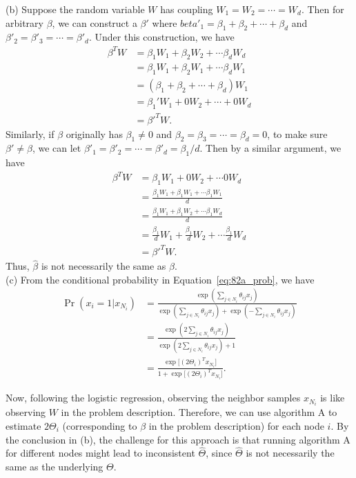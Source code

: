 \documentclass{article}
\newcommand{\qeds}{\hfill\qedsymbol}
\begin{document}
\noindent
(b)
%
Suppose the random variable $W$ has coupling $W_1 = W_2 = \cdots = W_d$. Then for arbitrary $\beta$,
we can construct a $\beta'$ where $beta'_1 = \beta_1 + \beta_2 + \cdots + \beta_d$ and
$\beta'_2 = \beta'_3 = \cdots = \beta'_d$. Under this construction, we have
\begin{align*}
	\beta^T W &= \beta_1W_1 + \beta_2W_2 + \cdots \beta_d W_d\\
	&= \beta_1W_1 + \beta_2W_1 + \cdots \beta_d W_1 \\
	&= (\beta_1 + \beta_2 + \cdots + \beta_d)W_1 \\
	& = \beta_1' W_1 + 0W_2 + \cdots + 0W_d\\
	& = \beta'^T W.
\end{align*}
Similarly, if $\beta$ originally has $\beta_1 \neq 0$ and $\beta_2 = \beta_3 = \cdots =\beta_d = 0$, 
to make sure $\beta' \neq \beta$, we can let $\beta'_1 = \beta'_2 = \cdots = \beta'_d = \beta_1 / d$.
Then by a similar argument, we have
\begin{align*}
	\beta^T W &= \beta_1W_1 + 0W_2 + \cdots 0 W_d\\
	&= \frac{\beta_1W_1 + \beta_1W_1 + \cdots \beta_1 W_1}{d} \\
	&= \frac{\beta_1W_1 + \beta_1W_2 + \cdots \beta_1 W_d}{d} \\
	& = \frac{\beta_1}{d}W_1 + \frac{\beta_1}{d}W_2 + \cdots \frac{\beta_1}{d} W_d\\
	& = \beta'^T W.
\end{align*}
Thus, $\hat{\beta}$ is not necessarily the same as $\beta$.\qeds
\\

\noindent
(c) From the conditional probability in Equation~\eqref{eq:82a_prob}, we have
\begin{align*}
	\Pr(x_i=1|x_{N_i}) &= \frac{\exp\left(\sum_{j\in N_i}\theta_{ij} x_j\right)}
{\exp\left(\sum_{j\in N_i}\theta_{ij} x_j\right) +
\exp\left(-\sum_{j\in N_i}\theta_{ij} x_j\right)} \\
	&=
\frac{\exp\left(2\sum_{j\in N_i}\theta_{ij} x_j\right)}
{\exp\left(2\sum_{j\in N_i}\theta_{ij} x_j\right) +
1}\\
&= 
\frac{\exp\big[(2\Theta_i)^T x_{N_i}\big]}
{1 + \exp\big[(2\Theta_i)^T x_{N_i}\big]}.
\end{align*}

Now, following the logistic regression, observing the neighbor samples $x_{N_i}$ is like observing
$W$ in the problem description. Therefore, we can use algorithm A to estimate $2\Theta_i$
(corresponding to $\beta$ in the problem description) for each node $i$.
By the conclusion in (b), the challenge for this approach is that running algorithm A for different nodes
might lead to inconsistent $\hat{\Theta}$, since $\hat{\Theta}$ is not necessarily the same as the underlying
$\Theta$.
\\
\end{document}
